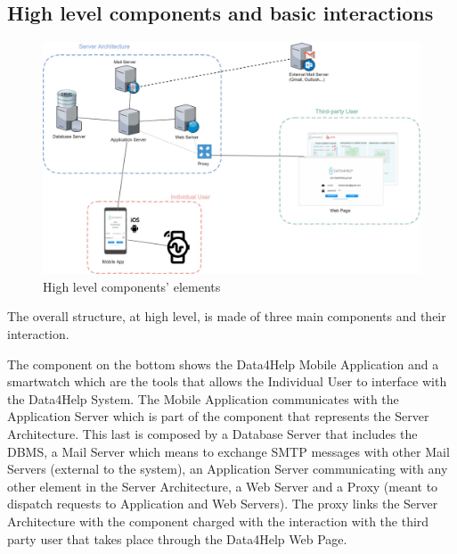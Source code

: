 \subsection{High level components and basic interactions}
\label{subsect:highLevel}
\begin{figure}[h]
\caption{High level components' elements}
\includegraphics[width = \textwidth]{sections/architecturalDesign/overview_1.jpg}
\end{figure}

The overall structure, at high level, is made of three main components and their interaction. 

The component on the bottom shows the Data4Help Mobile Application and a smartwatch which are the tools that allows the Individual User to interface with the Data4Help System. The Mobile Application communicates with the Application Server which is part of the component that represents the Server Architecture. 
This last is composed by a Database Server that includes the DBMS, a Mail Server which means to exchange SMTP messages with other Mail Servers (external to the system), an Application Server communicating with any other element in the Server Architecture, a Web Server and a Proxy (meant to dispatch requests to Application and Web Servers). 
The proxy links the Server Architecture with the component charged with the interaction with the third party user that takes place through the Data4Help Web Page. 

